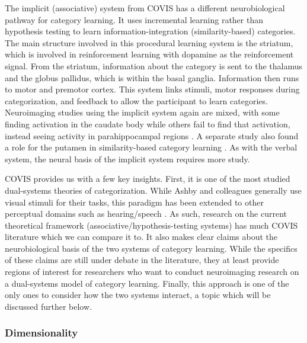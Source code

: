 \documentclass[../dissertation.tex]{subfiles}
\begin{document}
	The implicit (associative) system from COVIS has a different neurobiological pathway for category learning. It uses incremental learning rather than hypothesis testing to learn information-integration (similarity-based) categories. The main structure involved in this procedural learning system is the striatum, which is involved in reinforcement learning with dopamine as the reinforcement signal. From the striatum, information about the category is sent to the thalamus and the globus pallidus, which is within the basal ganglia. Information then runs to motor and premotor cortex. This  system links stimuli, motor responses during categorization, and feedback to allow the participant to learn categories. Neuroimaging studies using the implicit system again are mixed, with some finding activation in the caudate body while others fail to find that activation, instead seeing activity in parahippocampal regions \citep{Nomura2007,Carpenter2016}. A separate study also found a role for the putamen in similarity-based category learning \citep{Waldschmidt2011}. As with the verbal system, the neural basis of the implicit system requires more study. \par
	COVIS provides us with a few key insights. First, it is one of the most studied dual-systems theories of categorization. While Ashby and colleagues generally use visual stimuli for their tasks, this paradigm has been extended to other perceptual domains such as hearing/speech \citep{Chandrasekaran2014, Chandrasekaran2016}. As such, research on the current theoretical framework (associative/hypothesis-testing systems) has much COVIS literature which we can compare it to. It also makes clear claims about the neurobiological basis of the two systems of category learning. While the specifics of these claims are still under debate in the literature, they at least provide regions of interest for researchers who want to conduct neuroimaging research on a dual-systems model of category learning. Finally, this approach is one of the only ones to consider how the two systems interact, a topic which will be discussed further below. \par

	
\subsubsection{Dimensionality}
\end{document}
